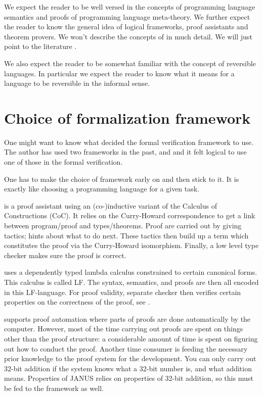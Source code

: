 We expect the reader to be well versed in the concepts of programming
language semantics and proofs of programming language meta-theory. We
further expect the reader to know the general idea of logical
frameworks, proof assistants and theorem provers. We won't describe
the concepts of \coq{} in much detail. We will just point to the
literature .

We also expect the reader to be somewhat familiar with the concept of
reversible languages. In particular we expect the reader to know what
it means for a language to be reversible in the informal sense.

\section{Choice of formalization framework}

One might want to know what decided the formal verification framework
to use. The author has used two frameworks in the past, \coq{} and \twelf{}
and it felt logical to use one of those in the formal verification.

One has to make the choice of framework early on and then stick to
it. It is exactly like choosing a programming language for a given
task.

\coq{} is a proof assistant using an (co-)inductive variant of the
Calculus of Constructions (CoC). It relies on the Curry-Howard
correspondence to get a link between program/proof and
types/theorems. Proof are carried out by giving tactics; hints about
what to do next. These tactics then build up a term which constitutes
the proof via the Curry-Howard isomorphism. Finally, a low level type
checker makes sure the proof is correct.

\twelf{} uses a dependently typed lambda calculus constrained to
certain canonical forms. This calculus is called LF. The syntax,
semantics, and proofs are then all encoded in this LF-language. For
proof validity, separate checker then verifies certain properties on
the correctness of the proof, see \cite{harper+05:how-to-believe,
  harper+07:mechanizing}.

\coq{} supports proof automation where parts of proofs are done
automatically by the computer. However, most of the time carrying out
proofs are spent on things other than the proof structure: a
considerable amount of time is spent on figuring out how to conduct
the proof. Another time consumer is feeding the necessary prior
knowledge to the proof system for the development. You can only carry
out 32-bit addition if the system knows what a 32-bit
number is, and what addition means. Properties of JANUS relies on
properties of 32-bit addition, so this must be fed to the framework as
well.

